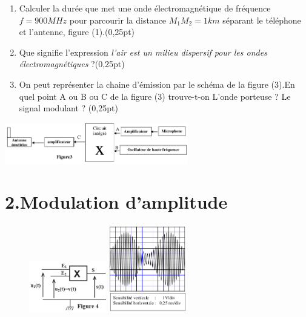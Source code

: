 \documentclass[12pt]{article}
\begin{document}
  \begin{enumerate}
    \item  Calculer la durée que met une onde électromagnétique de fréquence $f=900MHz$ pour parcourir la distance $M_1M_2=1km$ séparant le téléphone et l’antenne, figure (1).\dotfill(0,25pt) 
    \item Que signifie l’expression \emph{l’air est un milieu dispersif pour les ondes électromagnétiques} ?\dotfill(0,25pt)
    \item On peut représenter la chaine d’émission par le schéma de la figure (3).En quel point A  ou B ou C de la figure (3) trouve-t-on L’onde porteuse ? Le signal modulant ? \dotfill(0,25pt)

  \end{enumerate}
\begin{center}
  \includegraphics[width=0.6\textwidth]{./ex_032.png}
\end{center}

\vspace{-1.4cm}
\section*{2.Modulation d’amplitude \dotfill }

\begin{figure}
	\vspace{-1.2cm}
\begin{center}
  \includegraphics[width=0.3\textwidth]{./ex_033.png}

  \includegraphics[width=0.3\textwidth]{./ex_034.png}
\end{center}
\end{figure}
\end{document}
